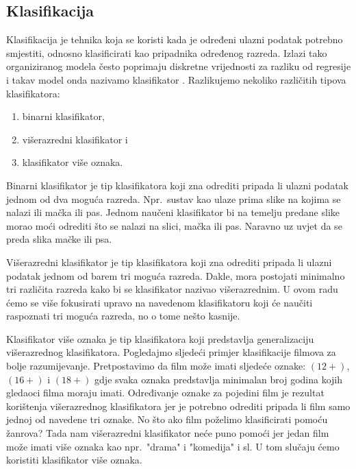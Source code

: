 \documentclass[times, utf8, zavrsni]{fer}
\begin{document}
\subsection{Klasifikacija}
\label{chap:classification}
Klasifikacija  je tehnika koja se koristi kada je određeni ulazni podatak potrebno smjestiti, odnosno klasificirati kao pripadnika određenog razreda. Izlazi tako organiziranog modela često poprimaju diskretne vrijednosti za razliku od regresije i takav model onda nazivamo klasifikator . Razlikujemo nekoliko različitih tipova klasifikatora:

\begin{enumerate}
    \item binarni klasifikator,
    \item višerazredni klasifikator i
    \item klasifikator više oznaka.
\end{enumerate}

\smallskip

Binarni klasifikator  je tip klasifikatora koji zna odrediti pripada li ulazni podatak jednom od dva moguća razreda. Npr.\ sustav kao ulaze prima slike na kojima se nalazi ili mačka ili pas. Jednom naučeni klasifikator bi na temelju predane slike morao moći odrediti što se nalazi na slici, mačka ili pas. Naravno uz uvjet da se preda slika mačke ili psa.

Višerazredni klasifikator  je tip klasifikatora koji zna odrediti pripada li ulazni podatak jednom od barem tri moguća razreda. Dakle, mora postojati minimalno tri različita razreda kako bi se klasifikator nazivao višerazrednim. U ovom radu ćemo se više fokusirati upravo na navedenom klasifikatoru koji će naučiti raspoznati tri moguća razreda, no o tome nešto kasnije.

Klasifikator više oznaka  je tip klasifikatora koji predstavlja generalizaciju višerazrednog klasifikatora. Pogledajmo sljedeći primjer klasifikacije filmova za bolje razumijevanje. Pretpostavimo da film može imati sljedeće oznake: $(12+)$, $(16+)$ i $(18+)$ gdje svaka oznaka predstavlja minimalan broj godina kojih gledaoci filma moraju imati. Određivanje oznake za pojedini film je rezultat korištenja višerazrednog klasifikatora jer je potrebno odrediti pripada li film samo jednoj od navedene tri oznake. No što ako film poželimo klasificirati pomoću žanrova? Tada nam višerazredni klasifikator neće puno pomoći jer jedan film može imati više oznaka kao npr.\ "drama" i "komedija" i sl. U tom slučaju ćemo koristiti klasifikator više oznaka.
\end{document}
